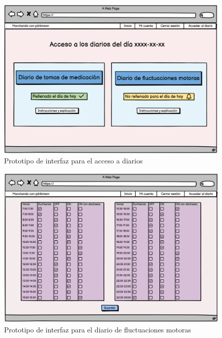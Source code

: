 \begin{figure}[h]
    \centering
    \includegraphics[width=1\textwidth]{img/wdiarios.png}
    \caption{Prototipo de interfaz para el acceso a diarios}
    \label{fig:Wireframediarios}
\end{figure}

\begin{figure}[h]
    \centering
    \includegraphics[width=1\textwidth]{img/wdiarioestados.png}
    \caption{Prototipo de interfaz para el diario de fluctuaciones motoras}
    \label{fig:Wireframeestados}
\end{figure}

